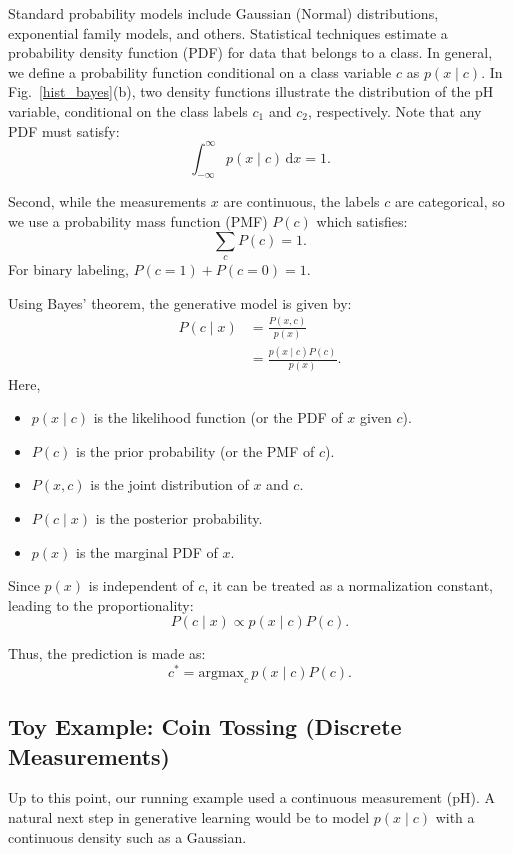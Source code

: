 \documentclass[12pt]{article}
\begin{document}
Standard probability models include Gaussian (Normal) distributions, exponential family models, and others. Statistical techniques estimate a probability density function (PDF) for data that belongs to a class. In general, we define a probability function conditional on a class variable \(c\) as \(p(x \mid c)\). In Fig.~\ref{hist_bayes}(b), two density functions illustrate the distribution of the pH variable, conditional on the class labels \(c_1\) and \(c_2\), respectively. Note that any PDF must satisfy:
\[
\int_{-\infty}^{\infty} p(x \mid c) \, \mathrm{d}x = 1.
\]

Second, while the measurements \(x\) are continuous, the labels \(c\) are categorical, so we use a probability mass function (PMF) \(P(c)\) which satisfies:
\[
\sum_{c} P(c) = 1.
\]
For binary labeling, \(P(c = 1) + P(c = 0) = 1\).

Using Bayes' theorem, the generative model is given by:
\begin{equation}
\begin{split}
P(c \mid x) &= \frac{P(x, c)}{p(x)} \\
           &= \frac{p(x \mid c)P(c)}{p(x)}.
\end{split}
\label{bayes01}
\end{equation}
Here,
\begin{itemize}
\item \(p(x \mid c)\) is the likelihood function (or the PDF of \(x\) given \(c\)).
\item \(P(c)\) is the prior probability (or the PMF of \(c\)).
\item \(P(x, c)\) is the joint distribution of \(x\) and \(c\).
\item \(P(c \mid x)\) is the posterior probability.
\item \(p(x)\) is the marginal PDF of \(x\).
\end{itemize}

Since \(p(x)\) is independent of \(c\), it can be treated as a normalization constant, leading to the proportionality:
\begin{equation}
    P(c \mid x) \propto p(x \mid c)P(c).
    \label{bayes02}
\end{equation}

Thus, the prediction is made as:
\[
c^* = \mathrm{argmax}_c\, p(x \mid c)P(c).
\]

\subsection{Toy Example: Coin Tossing (Discrete Measurements)}
Up to this point, our running example used a continuous measurement (pH). A natural next step in generative learning would be to model $p(x\mid c)$ with a continuous density such as a Gaussian.
\end{document}
